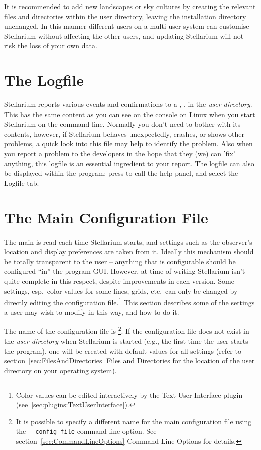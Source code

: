 It is recommended to add new landscapes or sky cultures by creating the relevant files
and directories within the user directory, leaving the installation
directory unchanged. In this manner different users on a multi-user
system can customise Stellarium without affecting the other users, and 
updating Stellarium will not risk the loss of your own data. 


\section{The Logfile}
\label{sec:LogFile}

Stellarium reports various events and confirmations to a , , 
in the \emph{user directory}. This has the same content as you can see on the console 
on Linux when you start Stellarium on the command line. Normally you don't need to bother with its contents, 
however, if Stellarium behaves unexpectedly, crashes, or shows other problems, a quick look into this 
file may help to identify the problem. Also when you report a problem to the developers in the hope 
that they (we) can 'fix' anything, this logfile is an essential ingredient to your report. 
The logfile can also be displayed within the program: press  to call the help panel, and select the Logfile tab. 


\section{The Main Configuration File}
\label{sec:ConfigurationFile}

The main  is read each time Stellarium starts, and
settings such as the observer's location and display preferences are
taken from it. Ideally this mechanism should be totally transparent to
the user -- anything that is configurable should be configured ``in''
the program GUI. However, at time of writing Stellarium isn't quite
complete in this respect, despite improvements in each version. Some
settings, esp.\ color values for some lines, grids, etc.\ can only be
changed by directly editing the configuration file.\footnote{Color
  values can be edited interactively by the Text User Interface plugin
  (see~\ref{sec:plugins:TextUserInterface}).} This section describes
some of the settings a user may wish to modify in this way, and how to
do it.

The name of the configuration file is
\footnote{It is possible to specify a different name
  for the main configuration file using the \texttt{-\/-config-file}
  command line option. See section~\ref{sec:CommandLineOptions} Command 
  Line Options for details.}.
If the configuration file does not exist in the \emph{user directory}
when Stellarium is started (e.g., the first time the user starts the
program), one will be created with default values for all settings
(refer to section~\ref{sec:FilesAndDirectories} Files and
Directories for the location of the user directory on your operating
system).


